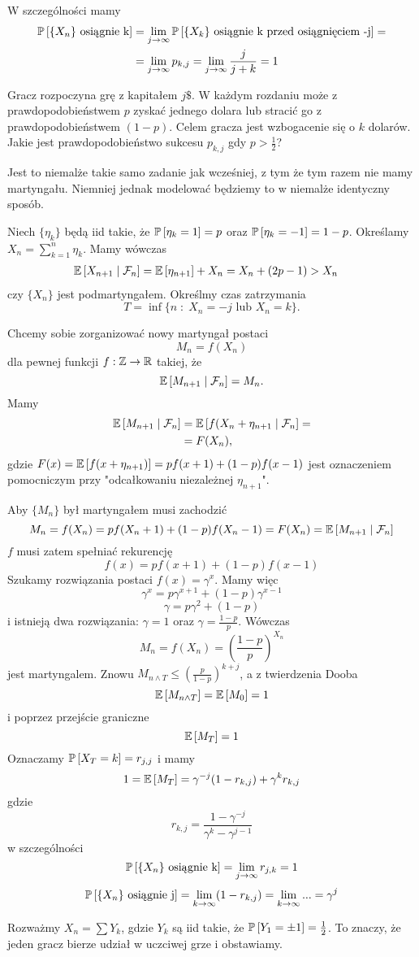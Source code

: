 \begin{example}
    W szczególności mamy
    \begin{align*}
      \prob{\{X_n\}\text{ osiągnie k}}&=\lim_{j\to\infty}\prob{\{X_k\}\text{ osiągnie k przed osiągnięciem -j}}=\\ 
                                      &=\lim_{j\to\infty}p_{k,j}=\lim_{j\to\infty}\frac{j}{j+k}=1
    \end{align*}
  \item Gracz rozpoczyna grę z kapitałem $j\$$. W każdym rozdaniu może z prawdopodobieństwem $p$ zyskać jednego dolara lub stracić go z prawdopodobieństwem $(1-p)$. Celem gracza jest wzbogacenie się o $k$ dolarów. Jakie jest prawdopodobieństwo sukcesu $p_{k,j}$ gdy $p>\frac{1}{2}$?

    Jest to niemalże takie samo zadanie jak wcześniej, z tym że tym razem nie mamy martyngału. Niemniej jednak modelować będziemy to w niemalże identyczny sposób.

    Niech $\{\eta_k\}$ będą iid takie, że $\prob{\eta_k=1}=p$ oraz $\prob{\eta_k=-1}=1-p$. Określamy $X_n=\sum_{k=1}^n\eta_k$. Mamy wówczas
    \begin{align*}
      \expected{X_{n+1}}{\set{F}_n}&=\expected{\eta_{n+1}}+X_n=X_n+(2p-1)>X_n
    \end{align*}
    czy $\{X_n\}$ jest podmartyngałem. Określmy czas zatrzymania
    $$T=\inf\{n\;:\;X_n=-j\text{ lub }X_n=k\}.$$

    Chcemy sobie zorganizować nowy martyngał postaci
    $$M_n=f(X_n)$$
    dla pewnej funkcji $f:\operatorname{\mathbb{Z}}\to\operatorname{\mathbb{R}}$ takiej, że
    $$\expected{M_{n+1}}{\set{F}_n}=M_n.$$
    Mamy
    \begin{align*}
      \expected{M_{n+1}}{\set{F}_n}&=\expected{f(X_n+\eta_{n+1}}{\set{F}_n}=\\ 
                                   &=F(X_n),
    \end{align*}
    gdzie $F(x)=\expected{f(x+\eta_{n+1})}=pf(x+1)+(1-p)f(x-1)$ jest oznaczeniem pomocniczym przy "odcałkowaniu niezależnej $\eta_{n+1}$".

    Aby $\{M_n\}$ był martyngałem musi zachodzić
    $$M_n=f(X_n)=pf(X_n+1)+(1-p)f(X_n-1)=F(X_n)=\expected{M_{n+1}}{\set{F}_n}$$
    $f$ musi zatem spełniać rekurencję
    $$f(x)=pf(x+1)+(1-p)f(x-1)$$
    Szukamy rozwiązania postaci $f(x)=\gamma^x$. Mamy więc
    $$\gamma^x=p\gamma^{x+1}+(1-p)\gamma^{x-1}$$
    $$\gamma=p\gamma^2+(1-p)$$
    i istnieją dwa rozwiązania: $\gamma=1$ oraz $\gamma=\frac{1-p}{p}$. Wówczas
    $$M_n=f(X_n)=\left(\frac{1-p}{p}\right)^{X_n}$$
    jest martyngalem. Znowu $M_{n\land T}\leq\left(\frac{p}{1-p}\right)^{k+j}$, a z twierdzenia Dooba
    $$\expected{M_{n\land T}}=\expected{M_0}=1$$
    i poprzez przejście graniczne
    $$\expected{M_T}=1$$
    Oznaczamy $\prob{X_T=k}=r_{j,j}$ i mamy
    $$1=\expected{M_T}=\gamma^{-j}(1-r_{k,j})+\gamma^kr_{k,j}$$
    gdzie
    $$r_{k,j}=\frac{1-\gamma^{-j}}{\gamma^k-\gamma^{j-1}}$$
    w szczególności
    $$\prob{\{X_n\}\text{ osiągnie k}}=\lim_{j\to\infty} r_{j,k}=1$$
    $$\prob{\{X_n\}\text{ osiągnie j}}=\lim_{k\to\infty}(1-r_{k,j})=\lim_{k\to\infty}...=\gamma^j$$

  \item Rozważmy $X_n=\sum Y_k$, gdzie $Y_k$ są iid takie, że $\prob{Y_1=\pm 1}=\frac{1}{2}$. To znaczy, że jeden gracz bierze udział w uczciwej grze i obstawiamy.
\end{example}
